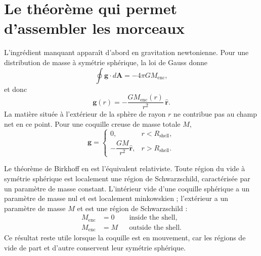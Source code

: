 \section{Le théorème qui permet d’assembler les morceaux}

L’ingrédient manquant apparaît d’abord en gravitation newtonienne. Pour une distribution de masse à symétrie sphérique, la loi de Gauss donne
\begin{equation}
\oint\mathbf g\cdot d\mathbf A=-4\pi G M_{\mathrm{enc}},
\end{equation}
et donc
\begin{equation}
\mathbf g(r)=-\frac{G M_{\mathrm{enc}}(r)}{r^2}\,\hat{\mathbf r}.
\label{eq:l05-shell-theorem}
\end{equation}
La matière située à l’extérieur de la sphère de rayon \(r\) ne contribue pas au champ net en ce point. Pour une coquille creuse de masse totale \(M\),
\begin{equation}
\mathbf g=
\begin{cases}
0, & r<R_{\mathrm{shell}},\\[3pt]
-\dfrac{GM}{r^2}\hat{\mathbf r}, & r>R_{\mathrm{shell}}.
\end{cases}
\end{equation}

Le théorème de Birkhoff en est l’équivalent relativiste. Toute région du vide à symétrie sphérique est localement une région de Schwarzschild, caractérisée par un paramètre de masse constant. L’intérieur vide d’une coquille sphérique a un paramètre de masse nul et est localement minkowskien ; l’extérieur a un paramètre de masse \(M\) et est une région de Schwarzschild :
\begin{equation}
\begin{aligned}
M_{\mathrm{enc}}&=0 && \text{inside the shell},\\
M_{\mathrm{enc}}&=M && \text{outside the shell}.
\end{aligned}
\label{eq:l05-birkhoff}
\end{equation}
Ce résultat reste utile lorsque la coquille est en mouvement, car les régions de vide de part et d’autre conservent leur symétrie sphérique.


